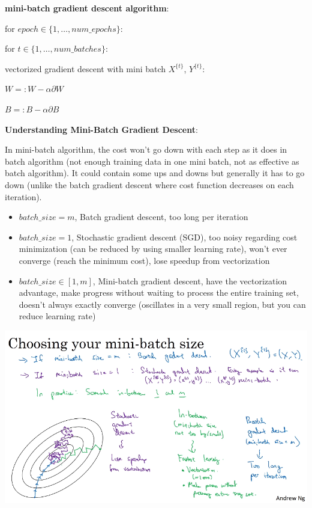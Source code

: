 \documentclass{article}
\begin{document}
\bigskip

\noindent \textbf{mini-batch gradient descent algorithm}:

\noindent for \(epoch \in \{1, \dots, num\_epochs\}\):

\noindent \hspace{.5cm} for \(t \in \{1, \dots, num\_batches\}\):

\noindent \hspace{1cm} vectorized gradient descent with mini batch \(X^{\{t\}}\), \(Y^{\{t\}}\):

\noindent \hspace{1cm} \(W =: W - \alpha \partial W\)

\noindent \hspace{1cm} \(B =: B - \alpha \partial B\)

\bigskip

\noindent \textbf{Understanding Mini-Batch Gradient Descent}:

\noindent In mini-batch algorithm, the cost won't go down with each step as it does in batch algorithm (not enough training data in one mini batch, not as effective as batch algorithm). It could contain some ups and downs but generally it has to go down (unlike the batch gradient descent where cost function decreases on each iteration).

\begin{itemize}
  \item \(batch\_size = m\), Batch gradient descent, too long per iteration
  \item \(batch\_size = 1\), Stochastic gradient descent (SGD), too noisy regarding cost minimization (can be reduced by using smaller learning rate), won't ever converge (reach the minimum cost), lose speedup from vectorization
  \item \(batch\_size \in [1, m]\), Mini-batch gradient descent, have the vectorization advantage, make progress without waiting to process the entire training set, doesn't always exactly converge (oscillates in a very small region, but you can reduce learning rate)
\end{itemize}

\begin{center}
\includegraphics[scale=0.4]{./images/mini_batch.png}
\end{center}
\end{document}
